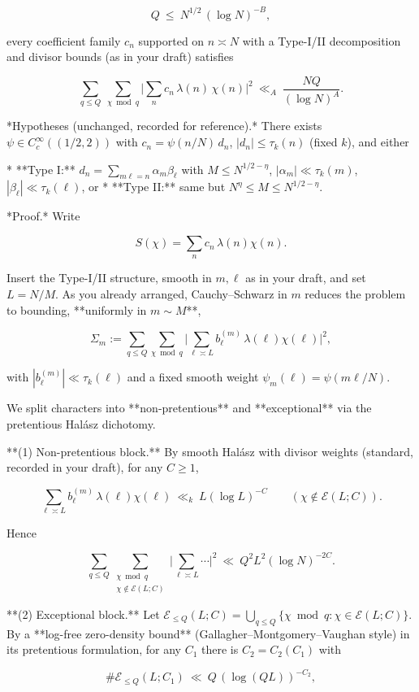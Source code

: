 \documentclass[11pt]{article}
\theoremstyle{definition}
\theoremstyle{remark}
\begin{document}
$$
Q\ \le\ N^{1/2}\,(\log N)^{-B},
$$

every coefficient family $c_n$ supported on $n\asymp N$ with a Type-I/II decomposition and divisor bounds (as in your draft) satisfies

$$
\sum_{q\le Q}\ \sum_{\chi\bmod q}
\Bigg|\sum_{n} c_n\,\lambda(n)\,\chi(n)\Bigg|^2
\ \ll_{A}\ \frac{NQ}{(\log N)^A}.
$$

*Hypotheses (unchanged, recorded for reference).*
There exists $\psi\in C_c^\infty((1/2,2))$ with $c_n=\psi(n/N)\,d_n$, $|d_n|\le \tau_k(n)$ (fixed $k$), and either

* **Type I:** $d_n=\sum_{m\ell=n}\alpha_m\beta_\ell$ with $M\le N^{1/2-\eta}$, $|\alpha_m|\ll \tau_k(m)$, $|\beta_\ell|\ll \tau_k(\ell)$, or
* **Type II:** same but $N^{\eta}\le M\le N^{1/2-\eta}$.

*Proof.* Write

$$
S(\chi)=\sum_{n} c_n\,\lambda(n)\chi(n).
$$

Insert the Type-I/II structure, smooth in $m,\ell$ as in your draft, and set $L=N/M$. As you already arranged, Cauchy–Schwarz in $m$ reduces the problem to bounding, **uniformly in $m\sim M$**,

$$
\Sigma_m:=\sum_{q\le Q}\sum_{\chi\bmod q}\Big|\sum_{\ell\asymp L} b^{(m)}_\ell\,\lambda(\ell)\chi(\ell)\Big|^2,
$$

with $|b^{(m)}_\ell|\ll \tau_k(\ell)$ and a fixed smooth weight $\psi_m(\ell)=\psi(m\ell/N)$.

We split characters into **non-pretentious** and **exceptional** via the pretentious Halász dichotomy.

**(1) Non-pretentious block.**
By smooth Halász with divisor weights (standard, recorded in your draft), for any $C\ge 1$,

$$
\sum_{\ell\asymp L} b^{(m)}_\ell\,\lambda(\ell)\chi(\ell)\ \ll_k\ L(\log L)^{-C}
\qquad(\chi\notin\mathcal E(L;C)).
$$

Hence

$$
\sum_{q\le Q}\sum_{\substack{\chi\bmod q\\ \chi\notin\mathcal E(L;C)}}
\Big|\sum_{\ell\asymp L}\cdots\Big|^2\ \ll\ Q^2 L^2 (\log N)^{-2C}.
$$

**(2) Exceptional block.**
Let $\mathcal E_{\le Q}(L;C)=\bigcup_{q\le Q}\{\chi\bmod q:\chi\in\mathcal E(L;C)\}$. By a **log-free zero-density bound** (Gallagher–Montgomery–Vaughan style) in its pretentious formulation, for any $C_1$ there is $C_2=C_2(C_1)$ with

$$
\#\mathcal E_{\le Q}(L;C_1)\ \ll\ Q\,(\log (QL))^{-C_2},
$$
\end{document}
